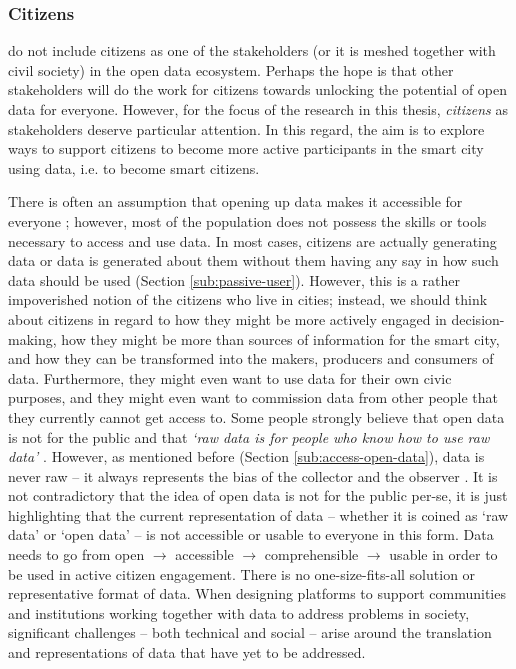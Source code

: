 \subsubsection{Citizens}
\label{sub:stake_citizens}
\citet{davies_state_2019} do not include citizens as one of the stakeholders (or it is meshed together with civil society) in the open data ecosystem. Perhaps the hope is that other stakeholders will do the work for citizens towards unlocking the potential of open data for everyone. However, for the focus of the research in this thesis, \textit{citizens} as stakeholders deserve particular attention. In this regard, the aim is to explore ways to support citizens to become more active participants in the smart city using data, i.e. to become smart citizens.

There is often an assumption that opening up data makes it accessible for everyone \citep{berners-lee_year_2010}; however, most of the population does not possess the skills or tools necessary to access and use data. In most cases, citizens are actually generating data or data is generated about them without them having any say in how such data should be used (Section \ref{sub:passive-user}). However, this is a rather impoverished notion of the citizens who live in cities; instead, we should think about citizens in regard to how they might be more actively engaged in decision-making, how they might be more than sources of information for the smart city, and how they can be transformed into the makers, producers and consumers of data. Furthermore, they might even want to use data for their own civic purposes, and they might even want to commission data from other people that they currently cannot get access to. Some people strongly believe that open data is not for the public and that \textit{`raw data is for people who know how to use raw data'} \citep{whong_thoughts_2015}. However, as mentioned before (Section \ref{sub:access-open-data}), data is never raw -- it always represents the bias of the collector and the observer \citep{tuomi_data_1999,gitelman_raw_2013}. It is not contradictory that the idea of open data is not for the public per-se, it is just highlighting that the current representation of data -- whether it is coined as `raw data' or `open data' -- is not accessible or usable to everyone in this form. Data needs to go from open $\rightarrow$ accessible $\rightarrow$ comprehensible $\rightarrow$ usable in order to be used in active citizen engagement. There is no one-size-fits-all solution or representative format of data. When designing platforms to support communities and institutions working together with data to address problems in society, significant challenges -- both technical and social -- arise around the translation and representations of data that have yet to be addressed.
\newline

